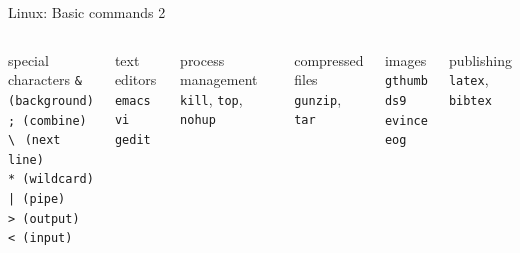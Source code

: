 \documentclass{beamer}
\begin{document}
\begin{frame}{Linux: Basic commands 2}
  \begin{columns}
    \begin{block}{special characters}
      \texttt{\& (background)} \\
      \texttt{; (combine)} \\
      \texttt{\textbackslash$\,$ (next line)} \\
      \texttt{* (wildcard)} \\
      \texttt{| (pipe)} \\
      \texttt{> (output)} \\            
      \texttt{< (input)}
    \end{block}
    \begin{block}{text editors}
      \texttt{emacs} \\
      \texttt{vi} \\
      \texttt{gedit}
    \end{block}

    \begin{block}{process management}
      \texttt{kill}, \texttt{top}, \texttt{nohup}
    \end{block}    
    \begin{block}{compressed files}
      \texttt{gunzip}, \texttt{tar} 
    \end{block}
    \begin{block}{images}
      \texttt{gthumb} \\
      \texttt{ds9} \\
      \texttt{evince} \\
      \texttt{eog}
    \end{block}    
    \begin{block}{publishing}
      \texttt{latex}, \texttt{bibtex} 
    \end{block}
  \end{columns}
\end{frame}
\end{document}
